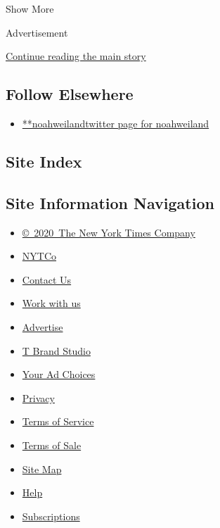 Show More

Advertisement

\protect\hyperlink{after-mid2}{Continue reading the main story}

\hypertarget{follow-elsewhere}{%
\subsection{Follow Elsewhere}\label{follow-elsewhere}}

\begin{itemize}
\tightlist
\item
  \href{https://twitter.com/noahweiland}{**noahweilandtwitter page for
  noahweiland}
\end{itemize}

\hypertarget{site-index}{%
\subsection{Site Index}\label{site-index}}

\hypertarget{site-information-navigation}{%
\subsection{Site Information
Navigation}\label{site-information-navigation}}

\begin{itemize}
\tightlist
\item
  \href{https://help.nytimes.com/hc/en-us/articles/115014792127-Copyright-notice}{©~2020~The
  New York Times Company}
\end{itemize}

\begin{itemize}
\tightlist
\item
  \href{https://www.nytco.com/}{NYTCo}
\item
  \href{https://help.nytimes.com/hc/en-us/articles/115015385887-Contact-Us}{Contact
  Us}
\item
  \href{https://www.nytco.com/careers/}{Work with us}
\item
  \href{https://nytmediakit.com/}{Advertise}
\item
  \href{http://www.tbrandstudio.com/}{T Brand Studio}
\item
  \href{https://www.nytimes.com/privacy/cookie-policy\#how-do-i-manage-trackers}{Your
  Ad Choices}
\item
  \href{https://www.nytimes.com/privacy}{Privacy}
\item
  \href{https://help.nytimes.com/hc/en-us/articles/115014893428-Terms-of-service}{Terms
  of Service}
\item
  \href{https://help.nytimes.com/hc/en-us/articles/115014893968-Terms-of-sale}{Terms
  of Sale}
\item
  \href{https://spiderbites.nytimes.com}{Site Map}
\item
  \href{https://help.nytimes.com/hc/en-us}{Help}
\item
  \href{https://www.nytimes.com/subscription?campaignId=37WXW}{Subscriptions}
\end{itemize}
